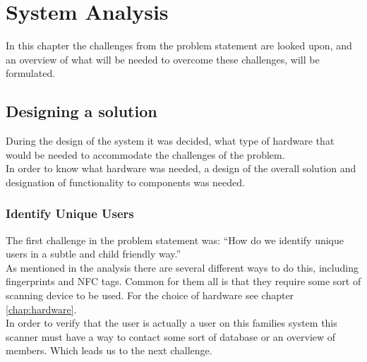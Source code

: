\chapter{System Analysis}
In this chapter the challenges from the problem statement are looked upon, and an overview of what will be needed to overcome these challenges, will be formulated.


\section{Designing a solution}
During the design of the system it was decided, what type of hardware that would be needed to accommodate the challenges of the problem.\\
In order to know what hardware was needed, a design of the overall solution and designation of functionality to components was needed.\\

\subsection{Identify Unique Users}
The first challenge in the problem statement was: ``How do we identify unique users in a subtle and child friendly way.''\\
As mentioned in the analysis there are several different ways to do this, including fingerprints and NFC tags. Common for them all is that they require some sort of scanning device to be used. For the choice of hardware see chapter \ref{chap:hardware}.\\
In order to verify that the user is actually a user on this families system this scanner must have a way to contact some sort of database or an overview of members. Which leads us to the next challenge.

